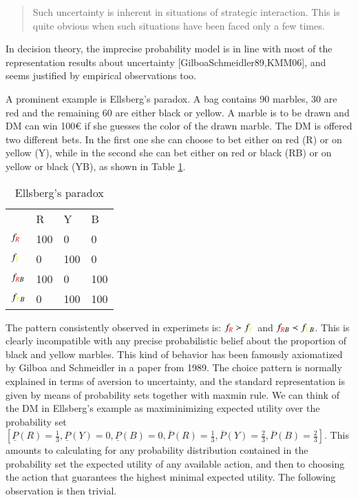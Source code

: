 \documentclass[fleqn,reqno,11pt]{article}
\begin{document}
\begin{quote}
Such uncertainty is inherent in situations of strategic interaction. This is quite obvious when such situations have been faced only a few times.
\end{quote}



In decision theory, the imprecise probability model is in line with most of the representation results about uncertainty [GilboaSchmeidler89,KMM06], and seems justified by empirical observations too. 

A prominent example is Ellsberg's paradox. A bag contains 90 marbles, 30 are red and the remaining 60 are either black or yellow. A marble is to be drawn and DM can win 100€ if she guesses the color of the drawn marble. The DM is offered two different bets. In the first one she can choose to bet either on red (R) or on yellow (Y), while in the second she can bet either on red or black (RB) or on yellow or black (YB), as shown in Table \ref{Ellsberg}.



\begin{table}[h]
\centering
\begin{tabular}{@{}llll@{}}
\cmidrule(l){2-4}
\multicolumn{1}{c}{} & {\color{red}R}   & {\color{yellow}Y}   & B   \\ \cmidrule(l){2-4} 
$f_{{\color{red}R}}$              & 100 & 0   & 0   \\
$f_{{\color{yellow}Y}}$              & 0   & 100 & 0   \\
$f_{{\color{red}R}B}$            & 100 & 0   & 100 \\
$f_{{\color{yellow}Y}B}$             & 0   & 100 & 100 \\ \bottomrule
\end{tabular}
\caption{Ellsberg's paradox}
\label{Ellsberg}
\end{table}

The pattern consistently observed in experimets is: $f_{{\color{red}R}} \succ f_{{\color{yellow}Y}}$ and $f_{{\color{red}R}B} \prec f_{{\color{yellow}Y}B}$. This is clearly incompatible with any precise probabilistic belief about the proportion of black and yellow marbles. This kind of behavior has been
famously axiomatized by Gilboa and Schmeidler in a paper from 1989. The choice pattern is normally explained in terms of aversion to uncertainty, and the standard representation is given by means of probability sets together with maxmin rule. We can think of the DM in Ellsberg's example as maximinimizing expected utility over the probability set $ [\underline{P}(R)=\frac{1}{3},\underline{P}(Y)=0,\underline{P}(B)=0,\overline{P}(R)=\frac{1}{3},\overline{P}(Y)=\frac{2}{3},\overline{P}(B)=\frac{2}{3}]  $. This amounts to calculating for any probability distribution contained in the probability set the expected utility of any available action, and then to choosing the action that guarantees the highest minimal expected utility. The following observation is then trivial.
\end{document}

